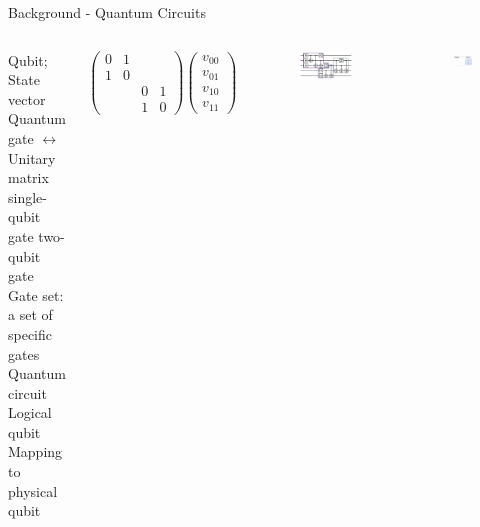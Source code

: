 \documentclass{beamer}
\begin{document}
\begin{frame}{Background - Quantum Circuits}
    \begin{columns}
            \begin{outline}
                \1 Qubit; State vector
                \1 Quantum gate $\leftrightarrow$ Unitary matrix
                    \2 single-qubit gate
                    \2 two-qubit gate
                \1 Gate set: a set of specific gates
                \1 Quantum circuit
                    \2 Logical qubit
                    \2 Mapping to physical qubit
            \end{outline}
            \vspace{1em}
            \begingroup
                \small
                $$
                \left(\begin{array}{llll}
                0 & 1 & & \\
                1 & 0 & & \\
                & & 0 & 1 \\
                & & 1 & 0
                \end{array}\right)\left(\begin{array}{l}
                v_{00} \\
                v_{01} \\
                v_{10} \\
                v_{11}
                \end{array}\right)
                $$
            \endgroup
            \begin{figure}
                \centering
                \includegraphics[scale=0.08]{qc.png}
            \end{figure}
            \begin{figure}
                \centering
                \includegraphics[scale=0.32]{IBM_penguin.jpg}
            \end{figure}
    \end{columns}
\end{frame}
\end{document}
